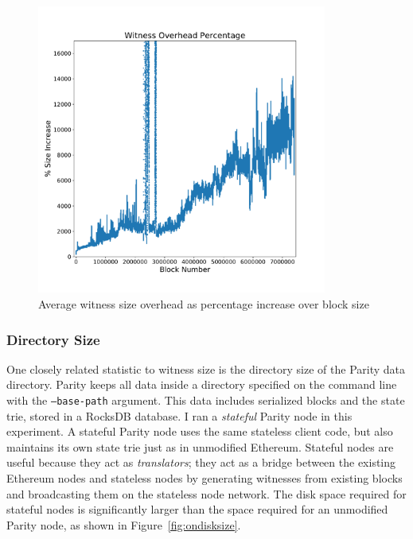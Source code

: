 \documentclass[12pt]{article}
\newcommand{\figurewidth}{0.85\textwidth}
\begin{document}
\begin{figure}[H]
  \centering
  \includegraphics[width=\figurewidth]{../figures/results/graphs/background/witness-block-size.pdf}
  \caption{Average witness size overhead as percentage increase over block size}
  \label{fig:witnesssizepct}
\end{figure}


\subsubsection{Directory Size}

One closely related statistic to witness size is the directory size of the Parity data directory. Parity keeps all data inside a directory specified on the command line with the \texttt{--base-path} argument. This data includes serialized blocks and the state trie, stored in a RocksDB database. I ran a \emph{stateful} Parity node in this experiment. A stateful Parity node uses the same stateless client code, but also maintains its own state trie just as in unmodified Ethereum. Stateful nodes are useful because they act as \emph{translators}; they act as a bridge between the existing Ethereum nodes and stateless nodes by generating witnesses from existing blocks and broadcasting them on the stateless node network. The disk space required for stateful nodes is significantly larger than the space required for an unmodified Parity node, as shown in Figure~\ref{fig:ondisksize}.
\end{document}
